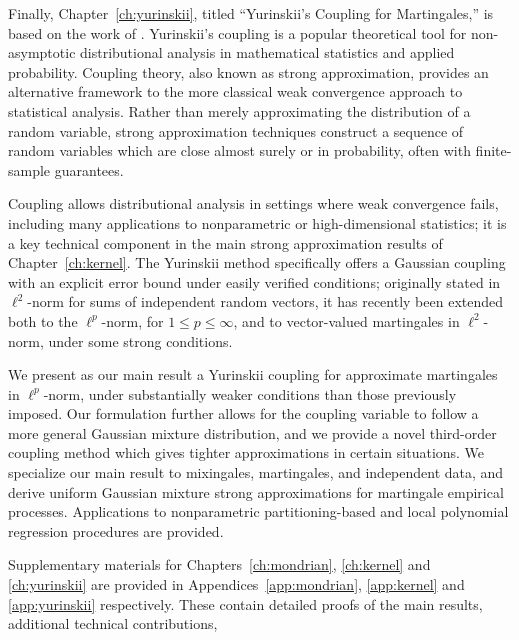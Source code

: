 Finally, Chapter~\ref{ch:yurinskii}, titled ``Yurinskii's Coupling for
Martingales,'' is based on the work of \cite{cattaneo2022yurinskii}.
Yurinskii's coupling is a popular theoretical tool for non-asymptotic
distributional analysis in mathematical statistics and applied probability.
Coupling theory, also known as strong approximation, provides an
alternative framework to the more classical weak convergence approach
to statistical analysis. Rather
than merely approximating the distribution of a random variable, strong
approximation techniques construct a sequence of random variables
which are close almost surely or in probability, often with
finite-sample guarantees.

Coupling allows distributional analysis in settings where weak convergence
fails, including many applications to nonparametric or high-dimensional
statistics; it is a key technical component in the main strong approximation
results of Chapter~\ref{ch:kernel}. The Yurinskii method specifically offers a
Gaussian coupling with an explicit error bound under easily verified
conditions; originally stated in $\ell^2$-norm for sums of independent random
vectors, it has recently been extended both to the $\ell^p$-norm, for $1 \leq p
\leq \infty$, and to vector-valued martingales in $\ell^2$-norm, under some
strong conditions.

We present as our main result a Yurinskii coupling for approximate martingales
in $\ell^p$-norm, under substantially weaker conditions than those previously
imposed. Our formulation further allows for the coupling variable to follow a
more general Gaussian mixture distribution, and we provide a novel third-order
coupling method which gives tighter approximations in certain situations. We
specialize our main result to mixingales, martingales, and independent data,
and derive uniform Gaussian mixture strong approximations for martingale
empirical processes. Applications to nonparametric partitioning-based and local
polynomial regression procedures are provided.

Supplementary materials for
Chapters~\ref{ch:mondrian}, \ref{ch:kernel} and \ref{ch:yurinskii}
are provided in Appendices~\ref{app:mondrian}, \ref{app:kernel}
and \ref{app:yurinskii} respectively.
These contain detailed proofs of the main results, additional technical
contributions,

